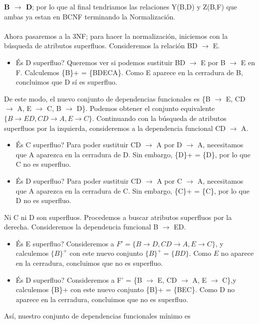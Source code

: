 \documentclass[a4paper, 12pt]{report}
\begin{document}
\begin{enumerate}
\begin{enumerate}
	\textbf{B $\rightarrow$ D};
	por lo que al final tendriamos las relaciones Y(B,D) y Z(B,F) que ambas ya estan en BCNF terminando la Normalización.
	\\\\
	Ahora pasaremos a la 3NF; para hacer la normalización, iniciemos con
  la búsqueda de atributos superfluos. Consideremos la relación
  BD $\rightarrow$ E.
  \begin{itemize}
    \item És D superfluo?  Queremos ver si podemos sustituir
      BD $\rightarrow$ E por B $\rightarrow$ E en F.   Calculemos \{B\}+ =
      \{BDECA\}. Como E aparece en la cerradura de B,
      concluimos que D sí es superfluo.
  \end{itemize}
  De este modo, el nuevo conjunto de dependencias funcionales
  es \{B $\rightarrow$ E, CD $\rightarrow$ A, E $\rightarrow$ C, B $\rightarrow$ D\}. Podemos obtener el conjunto equivalente
  $\{B \to ED, CD \to A, E \to C\}$.  Continuando con la búsqueda
  de atributos superfluos por la izquierda, consideremos a la
  dependencia funcional CD $\rightarrow$ A.
  \begin{itemize}
    \item És C superfluo? Para poder sustituir CD $\rightarrow$ A por
      D $\rightarrow$ A, necesitamos que A aparezca en la cerradura de
      D.   Sin embargo, \{D\}+ = \{D\}, por lo que C no
      es superfluo.

    \item És D superfluo? Para poder sustituir CD $\rightarrow$ A por
      C $\rightarrow$ A, necesitamos que A aparezca en la cerradura de
      C.   Sin embargo, \{C\}+ = \{C\}, por lo que D no
      es superfluo.
  \end{itemize}
  Ni C ni D son superfluos.   Procedemos a buscar atributos
  superfluos por la derecha.   Consideremos la dependencia funcional
  B $\rightarrow$ ED.
  \begin{itemize}
    \item És E superfluo?   Consideremos a $F' = \{ B \to D,
      CD \to A, E \to C\}$, y calculemos $\{B\}^+$ con este nuevo
      conjunto $\{B\}^+ = \{BD\}$.   Como $E$ no aparece en la
      cerradura, concluimos que no es superfluo.

    \item És D superfluo?   Consideremos a F' = \{B $\rightarrow$ E,
      CD $\rightarrow$ A, E $\rightarrow$ C\},y calculemos \{B\}+ con este nuevo
      conjunto \{B\}+ = \{BEC\}. Como D no aparece en la
      cerradura, concluimos que no es superfluo.
  \end{itemize}
  Así, nuestro conjunto de dependencias funcionales mínimo
  es


\end{enumerate}
\end{enumerate}
\end{document}
